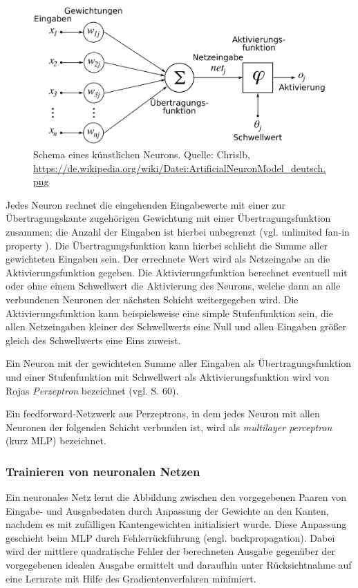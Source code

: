 \documentclass[
	12pt,
	a4paper,
	BCOR10mm,
	DIV14,
	listof=totoc,
	bibliography=totoc,
	headsepline
]{scrreprt}
\begin{document}
\begin{figure}[h]
	\begin{center}
		\includegraphics[totalheight=0.2\textheight]{Bilder/ArtificialNeuronModel_deutsch.png}
	\end{center}
	\caption{Schema eines künstlichen Neurons. Quelle: Chrislb, \url{https://de.wikipedia.org/wiki/Datei:ArtificialNeuronModel_deutsch.png}} %
	\label{fig:Neuron}
\end{figure}

Jedes Neuron rechnet die eingehenden Eingabewerte mit einer zur Übertragungskante zugehörigen Gewichtung mit einer Übertragungsfunktion zusammen; die Anzahl der Eingaben ist hierbei unbegrenzt (vgl. \glqq unlimited fan-in property\grqq{} \cite{Rojas:1996:NNS:235222}). Die Übertragungsfunktion kann hierbei schlicht die Summe aller gewichteten Eingaben sein. Der errechnete Wert wird als Netzeingabe an die Aktivierungsfunktion gegeben. 
Die Aktivierungsfunktion berechnet eventuell mit oder ohne einem Schwellwert die Aktivierung des Neurons, welche dann an alle verbundenen Neuronen der nächsten Schicht weitergegeben wird.
Die Aktivierungsfunktion kann beispielsweise eine simple Stufenfunktion sein, die allen Netzeingaben kleiner des Schwellwerts eine Null und allen Eingaben größer gleich des Schwellwerts eine Eins zuweist.

Ein Neuron mit der gewichteten Summe aller Eingaben als Übertragungsfunktion und einer Stufenfunktion mit Schwellwert als Aktivierungsfunktion wird von Rojas \textit{Perzeptron} bezeichnet (vgl. \cite{Rojas:1996:NNS:235222} S. 60).
\medskip

Ein feedforward-Netzwerk aus Perzeptrons, in dem jedes Neuron mit allen Neuronen der folgenden Schicht verbunden ist, wird als \textit{multilayer perceptron} (kurz MLP) bezeichnet.

\subsubsection{Trainieren von neuronalen Netzen}
Ein neuronales Netz lernt die Abbildung zwischen den vorgegebenen Paaren von Eingabe- und Ausgabedaten durch Anpassung der Gewichte an den Kanten, nachdem es mit zufälligen Kantengewichten initialisiert wurde.
Diese Anpassung geschieht beim MLP durch Fehlerrückführung (engl. backpropagation). Dabei wird der mittlere quadratische Fehler der berechneten Ausgabe gegenüber der vorgegebenen idealen Ausgabe ermittelt und daraufhin unter Rücksichtnahme auf eine Lernrate mit Hilfe des Gradientenverfahren minimiert.
\end{document}
